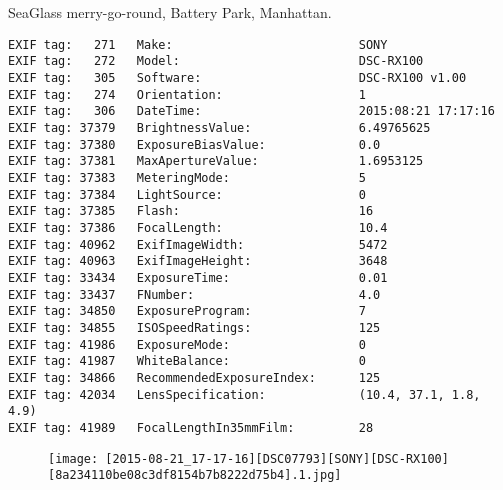 \section{\protect{}}
\noindent SeaGlass merry-go-round, Battery Park, Manhattan.
\noindent
\begin{lstlisting}
EXIF tag:   271   Make:                          SONY
EXIF tag:   272   Model:                         DSC-RX100
EXIF tag:   305   Software:                      DSC-RX100 v1.00
EXIF tag:   274   Orientation:                   1
EXIF tag:   306   DateTime:                      2015:08:21 17:17:16
EXIF tag: 37379   BrightnessValue:               6.49765625
EXIF tag: 37380   ExposureBiasValue:             0.0
EXIF tag: 37381   MaxApertureValue:              1.6953125
EXIF tag: 37383   MeteringMode:                  5
EXIF tag: 37384   LightSource:                   0
EXIF tag: 37385   Flash:                         16
EXIF tag: 37386   FocalLength:                   10.4
EXIF tag: 40962   ExifImageWidth:                5472
EXIF tag: 40963   ExifImageHeight:               3648
EXIF tag: 33434   ExposureTime:                  0.01
EXIF tag: 33437   FNumber:                       4.0
EXIF tag: 34850   ExposureProgram:               7
EXIF tag: 34855   ISOSpeedRatings:               125
EXIF tag: 41986   ExposureMode:                  0
EXIF tag: 41987   WhiteBalance:                  0
EXIF tag: 34866   RecommendedExposureIndex:      125
EXIF tag: 42034   LensSpecification:             (10.4, 37.1, 1.8, 4.9)
EXIF tag: 41989   FocalLengthIn35mmFilm:         28

\end{lstlisting}
\clearpage
\begin{figure}
\raggedleft
\texttt{[image: [2015-08-21\_17-17-16][DSC07793][SONY][DSC-RX100][8a234110be08c3df8154b7b8222d75b4].1.jpg]}
\end{figure}


\clearpage
